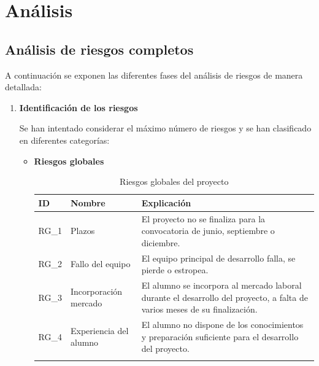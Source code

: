 \chapter{Análisis}
\section{Análisis de riesgos completos}
A continuación se exponen las diferentes fases del análisis de riesgos de manera detallada: 

\begin{enumerate}

\item \textbf{Identificación de los riesgos}

Se han intentado considerar el máximo número de riesgos y se han clasificado en diferentes categorías:

\begin{itemize}

\item \textbf{Riesgos globales}
\begingroup
\renewcommand\arraystretch{1.3}

\begin{longtable}{l p{5cm} p{9cm}}
\hline
\textbf{ID} & \textbf{Nombre} & \textbf{Explicación} \\
\hline
\endhead
\endfoot
RG\_1 & 
Plazos &
El proyecto no se finaliza para la convocatoria de junio, septiembre o diciembre.
 \\
RG\_2 & 
Fallo del equipo &
El equipo principal de desarrollo falla, se pierde o estropea. 
 \\
RG\_3 & 
Incorporación mercado &
El alumno se incorpora al mercado laboral durante el desarrollo del proyecto, a falta de varios meses de su finalización.
 \\
RG\_4 & 
Experiencia del alumno &
El alumno no dispone de los conocimientos y preparación suficiente para el desarrollo del proyecto. 
 \\
\hline
\caption{Riesgos globales del proyecto}\label{ries_glob}\\
\end{longtable}


\end{itemize}
\end{enumerate}
